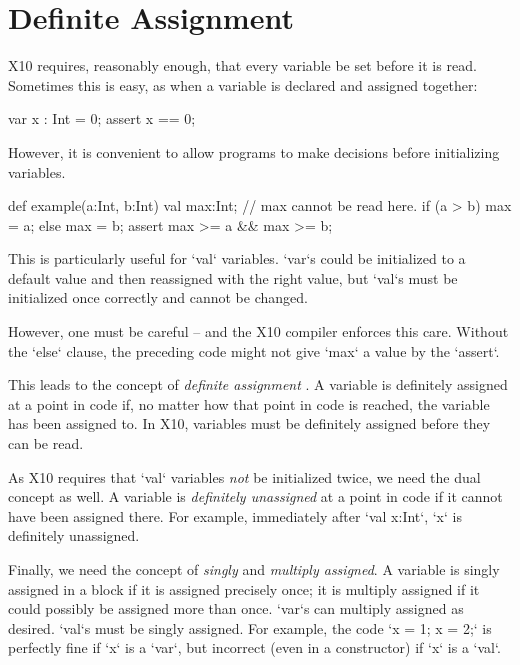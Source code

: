 \chapter{Definite Assignment}
\label{sect:DefiniteAssignment}

X10 requires, reasonably enough, that every variable be set before it is read.
Sometimes this is easy, as when a variable is declared and assigned together: 
\begin{xten}
  var x : Int = 0;
  assert x == 0;
\end{xten}
However, it is convenient to allow programs to make decisions before
initializing variables.
\begin{xten}
def example(a:Int, b:Int) {
  val max:Int;
  // max cannot be read here.
  if (a > b) max = a;
  else max = b;
  assert max >= a && max >= b;
}
\end{xten}
This is particularly useful for \xcd`val` variables.  \xcd`var`s could be
initialized to a default value and then reassigned with the right value, but
\xcd`val`s must be initialized once correctly and cannot be changed. 

However, one must be careful -- and the X10 compiler enforces this care.
Without the \xcd`else` clause, the preceding code might not give \xcd`max` a
value by the \xcd`assert`.  

This leads to the concept of {\em definite assignment} \cite{Javasomething}.
A variable is definitely assigned at a point in code if, no matter how that
point in code is reached, the variable has been assigned to.  In X10,
variables must be definitely assigned before they can be read.


As X10 requires that \xcd`val` variables {\em not} be initialized
twice,  we need the dual concept as well.  A variable is {\em definitely
unassigned} at a point in code if it cannot have been assigned there.  For
example, immediately after \xcd`val x:Int`, \xcd`x` is definitely unassigned. 

Finally, we need the concept of {\em singly} and {\em multiply assigned}.
A variable is singly assigned in a block if it is assigned precisely
once; it is multiply assigned if it could possibly be assigned more than once.  
\xcd`var`s can  multiply assigned as desired. \xcd`val`s must be singly
assigned.  For example, the code \xcd`x = 1; x = 2;` is perfectly fine if
\xcd`x` is a \xcd`var`, but incorrect (even in a constructor) if \xcd`x` is a
\xcd`val`.  

